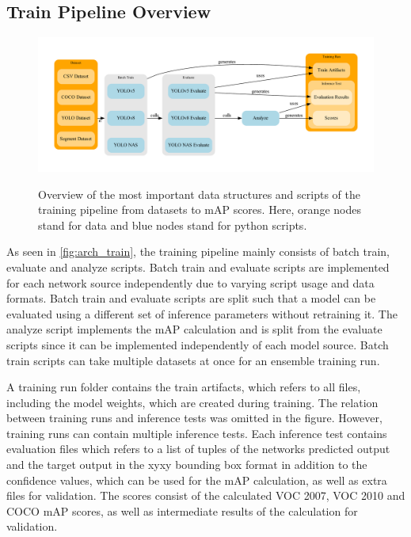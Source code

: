 \documentclass[10pt]{book}
\newcommand{\figureref}[1]{\autoref{#1}}
\begin{document}
\subsection{Train Pipeline Overview}

\begin{figure}
  \caption{Overview of the most important data structures and scripts of the training pipeline from datasets to \ac{mAP} scores. Here, orange nodes stand for data and blue nodes stand for python scripts.}
  \includegraphics[width=\textwidth]{graph/arch_train}
  \label{fig:arch_train}
\end{figure}

As seen in \figureref{fig:arch_train}, the training pipeline mainly consists of batch train, evaluate and analyze scripts. Batch train and evaluate scripts are implemented for each network source independently due to varying script usage and data formats. Batch train and evaluate scripts are split such that a model can be evaluated using a different set of inference parameters without retraining it. The analyze script implements the \ac{mAP} calculation and is split from the evaluate scripts since it can be implemented independently of each model source. Batch train scripts can take multiple datasets at once for an ensemble training run.

A training run folder contains the train artifacts, which refers to all files, including the model weights, which are created during training. The relation between training runs and inference tests was omitted in the figure. However, training runs can contain multiple inference tests. Each inference test contains evaluation files which refers to a list of tuples of the networks predicted output and the target output in the xyxy bounding box format in addition to the confidence values, which can be used for the \ac{mAP} calculation, as well as extra files for validation. The scores consist of the calculated VOC 2007, VOC 2010 and \ac{COCO} \ac{mAP} scores, as well as intermediate results of the calculation for validation.
\end{document}
